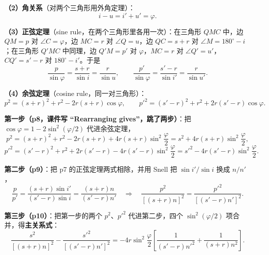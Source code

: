 \documentclass[11pt]{ctexart}
\begin{document}
\textbf{（2）角关系}（对两个三角形用外角定理）：
\[
i-u=i'+u'=\varphi .
\]

\textbf{（3）正弦定理}（sine rule，在两个三角形里各用一次）：在三角形 $QMC$ 中，边 $QM=p$ 对 $\angle C=\varphi$，边 $MC=r$ 对 $\angle Q=u$，边 $QC=s+r$ 对 $\angle M=180^\circ-i$；在三角形 $Q'MC$ 中同理，边 $Q'M=p'$ 对 $\varphi$，$MC=r$ 对 $\angle Q'=u'$，$CQ'=s'-r$ 对 $180^\circ-i'$。于是
\[
\frac{p}{\sin\varphi}=\frac{s+r}{\sin i}=\frac{r}{\sin u},
\qquad
\frac{p'}{\sin\varphi}=\frac{s'-r}{\sin i'}=\frac{r}{\sin u'} .
\]

\textbf{（4）余弦定理}（cosine rule，同一对三角形）：
\[
p^2=(s+r)^2+r^2-2r(s+r)\cos\varphi ,
\qquad
p'^2=(s'-r)^2+r^2+2r(s'-r)\cos\varphi .
\]


\textbf{第一步（p8，课件写 ``Rearranging gives''，跳了两步）}：把 $\cos\varphi=1-2\sin^2(\varphi/2)$ 代进余弦定理，
\[
p^2=(s+r)^2+r^2-2r(s+r)+4r(s+r)\sin^2\frac{\varphi}{2}
=s^2+4r(s+r)\sin^2\frac{\varphi}{2},
\]
\[
p'^2=(s'-r)^2+r^2+2r(s'-r)-4r(s'-r)\sin^2\frac{\varphi}{2}
=s'^2-4r(s'-r)\sin^2\frac{\varphi}{2}.
\]

\textbf{第二步（p9）}：把 p7 的正弦定理两式相除，并用 Snell 把 $\sin i'/\sin i$ 换成 $n/n'$，
\[
\frac{p}{p'}=\frac{(s+r)\sin i'}{(s'-r)\sin i}=\frac{(s+r)n}{(s'-r)n'}
\quad\Longrightarrow\quad
\frac{p^2}{[(s+r)n]^2}=\frac{p'^2}{[(s'-r)n']^2}.
\]

\textbf{第三步（p10）}：把第一步的两个 $p^2$、$p'^2$ 代进第二步，四个 $\sin^2(\varphi/2)$ 项合并，得\textbf{主关系式}：
\[
\frac{s^2}{[(s+r)n]^2}-\frac{s'^2}{[(s'-r)n']^2}
=-4r\sin^2\frac{\varphi}{2}\left[\frac{1}{(s'-r)n'^2}+\frac{1}{(s+r)n^2}\right].
\]
\end{document}
